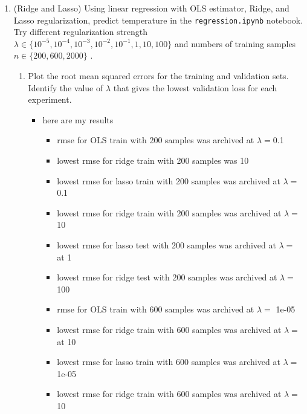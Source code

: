 \documentclass[12pt,twoside]{article}
\begin{document}
\begin{enumerate}
\begin{enumerate}
\begin{itemize}
\end{itemize}
   
   \end{enumerate}

\item (Ridge and Lasso)
Using linear regression with OLS estimator, Ridge, and Lasso regularization, predict temperature in the \texttt{regression.ipynb} notebook. Try different regularization strength $\lambda \in \{10^{-5}, 10^{-4}, 10^{-3}, 10^{-2}, 10^{-1}, 1, 10, 100\}$ and numbers of training samples $n \in \{200, 600, 2000\}$ .

\begin{enumerate}
\item Plot the root mean squared errors for the training and validation sets. Identify the value of $\lambda$ that gives the lowest validation loss for each experiment.
\begin{itemize}
    \color{orange}
    \item here are my results 
    \begin{itemize}
         \item rmse for OLS train with 200 samples was archived at $\lambda=$0.1
\item lowest rmse for ridge train with 200 samples was 10

\item lowest rmse for lasso train with 200 samples was archived at $\lambda=$ 0.1

\item lowest rmse for ridge train with 200 samples was archived at $\lambda=$ 10

\item lowest rmse for lasso test with 200 samples was archived at $\lambda=$ at 1

\item lowest rmse for ridge test with 200 samples was archived at $\lambda=$ 100

 \item rmse for OLS train with 600 samples was archived at $\lambda=$ 1e-05

\item lowest rmse for ridge train with 600 samples was archived at $\lambda=$ at 10

\item lowest rmse for lasso train with 600 samples was archived at $\lambda=$ 1e-05

\item lowest rmse for ridge train with 600 samples was archived at $\lambda=$ 10


\end{itemize}
\end{itemize}
\end{enumerate}
\end{enumerate}
\end{document}
